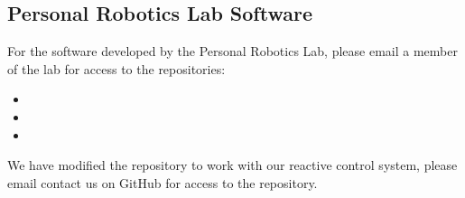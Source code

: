\begin{appendices}
\section{Personal Robotics Lab Software}
For the software developed by the Personal Robotics Lab, please email a member of the lab for access to the repositories:

\begin{itemize}
	\item {}
	\item {}
	\item {}
\end{itemize}

We have modified the  repository to work with our reactive control system, please email contact us on GitHub for access to the repository.

\end{appendices}